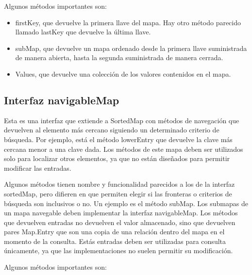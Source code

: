 \documentclass[11pt]{article}
\begin{document}
\par

Algunos métodos importantes son:

\begin{itemize}

\item firstKey, que devuelve la primera llave del mapa. Hay otro 
método parecido llamado lastKey que devuelve la última llave.

\item subMap, que devuelve un mapa ordenado desde la primera llave 
suministrada de manera abierta, hasta la segunda suministrada de 
manera cerrada.

\item Values, que devuelve una colección de los valores contenidos en 
el mapa.

\end{itemize}


\subsection{Interfaz navigableMap}

\par

Esta es una interfaz que extiende a SortedMap con métodos de 
navegación que devuelven al elemento más cercano siguiendo un 
determinado criterio de búsqueda. Por ejemplo, está el método 
lowerEntry que devuelve la clave más cercana menor a una clave dada. 
Los métodos de este mapa deben ser utilizados solo para localizar 
otros elementos, ya que no están diseñados para permitir modificar 
las entradas. 

\par

Algunos métodos tienen nombre y funcionalidad parecidos a los de la 
interfaz sortedMap, pero difieren en que permiten elegir si las 
fronteras o criterios de búsqueda son inclusivos o no. Un ejemplo es 
el método subMap. Los submapas de un mapa navegable deben implementar 
la interfaz navigableMap. Los métodos que devuelven entradas no 
devuelven el valor almacenado, sino que devuelven pares Map.Entry que 
son una copia de una relación dentro del mapa en el momento de la 
consulta. Estás entradas deben ser utilizadas para consulta 
únicamente, ya que las implementaciones no suelen permitir su 
modificación.

\par

Algunos métodos importantes son:
\end{document}

